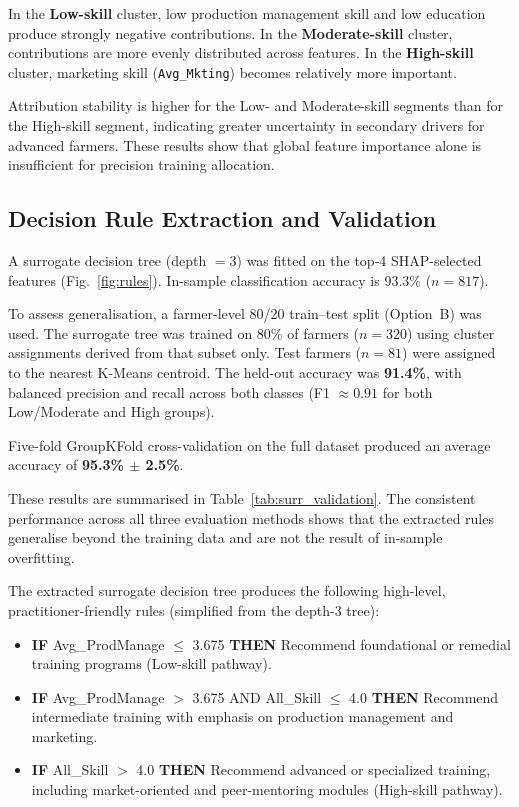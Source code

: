 \documentclass[3p,twocolumn,authoryear]{elsarticle}
\begin{document}
In the \textbf{Low-skill} cluster, low production management skill and low
education produce strongly negative contributions. In the \textbf{Moderate-skill}
cluster, contributions are more evenly distributed across features. In the
\textbf{High-skill} cluster, marketing skill (\texttt{Avg\_Mkting}) becomes
relatively more important.

Attribution stability is higher for the Low- and Moderate-skill segments than
for the High-skill segment, indicating greater uncertainty in secondary drivers
for advanced farmers. These results show that global feature importance alone is
insufficient for precision training allocation.

\subsection{Decision Rule Extraction and Validation}

A surrogate decision tree (depth $= 3$) was fitted on the top-4 SHAP-selected
features (Fig.~\ref{fig:rules}). In-sample classification accuracy is 93.3\%
($n = 817$).

To assess generalisation, a farmer-level 80/20 train--test split (Option~B) was
used. The surrogate tree was trained on 80\% of farmers ($n = 320$) using
cluster assignments derived from that subset only. Test farmers ($n = 81$) were
assigned to the nearest K-Means centroid. The held-out accuracy was
\textbf{91.4\%}, with balanced precision and recall across both classes
(F1 $\approx 0.91$ for both Low/Moderate and High groups).

Five-fold GroupKFold cross-validation on the full dataset produced an average
accuracy of \textbf{95.3\% $\pm$ 2.5\%}.

These results are summarised in Table~\ref{tab:surr_validation}. The consistent
performance across all three evaluation methods shows that the extracted rules
generalise beyond the training data and are not the result of in-sample
overfitting.

The extracted surrogate decision tree produces the following high-level, practitioner-friendly rules 
(simplified from the depth-3 tree):

\begin{itemize}
    \item \textbf{IF} Avg\_ProdManage $\leq$ 3.675 \textbf{THEN} Recommend foundational or 
    remedial training programs (Low-skill pathway).
    \item \textbf{IF} Avg\_ProdManage $>$ 3.675 AND All\_Skill $\leq$ 4.0 \textbf{THEN} Recommend 
    intermediate training with emphasis on production management and marketing.
    \item \textbf{IF} All\_Skill $>$ 4.0 \textbf{THEN} Recommend advanced or specialized training, 
    including market-oriented and peer-mentoring modules (High-skill pathway).
\end{itemize}
\end{document}
